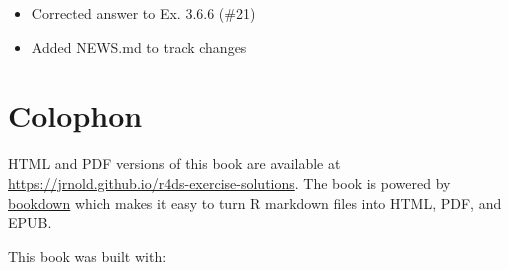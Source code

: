 \documentclass[]{book}
\providecommand{\tightlist}{%
  \setlength{\itemsep}{0pt}\setlength{\parskip}{0pt}}
\theoremstyle{plain}
\theoremstyle{remark}
\theoremstyle{definition}
\theoremstyle{definition}
\theoremstyle{definition}
\theoremstyle{remark}
\begin{document}
\begin{itemize}
\tightlist
\item
  Corrected answer to Ex. 3.6.6 (\#21)
\item
  Added NEWS.md to track changes
\end{itemize}

\hypertarget{colophon}{%
\section*{Colophon}\label{colophon}}

HTML and PDF versions of this book are available at
\url{https://jrnold.github.io/r4ds-exercise-solutions}. The book is
powered by \href{https://bookdown.org}{bookdown} which makes it easy to
turn R markdown files into HTML, PDF, and EPUB.

This book was built with:
\end{document}
